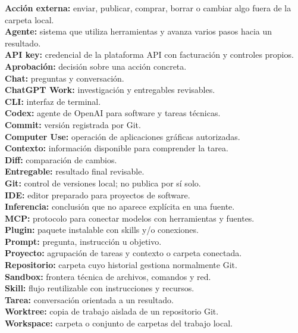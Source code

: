 \documentclass[10pt,a4paper,openany]{book}
\begin{document}
\textbf{Acción externa:} enviar, publicar, comprar, borrar o cambiar
algo fuera de la carpeta local.\\
\textbf{Agente:} sistema que utiliza herramientas y avanza varios pasos
hacia un resultado.\\
\textbf{API key:} credencial de la plataforma API con facturación y
controles propios.\\
\textbf{Aprobación:} decisión sobre una acción concreta.\\
\textbf{Chat:} preguntas y conversación.\\
\textbf{ChatGPT Work:} investigación y entregables revisables.\\
\textbf{CLI:} interfaz de terminal.\\
\textbf{Codex:} agente de OpenAI para software y tareas técnicas.\\
\textbf{Commit:} versión registrada por Git.\\
\textbf{Computer Use:} operación de aplicaciones gráficas autorizadas.\\
\textbf{Contexto:} información disponible para comprender la tarea.\\
\textbf{Diff:} comparación de cambios.\\
\textbf{Entregable:} resultado final revisable.\\
\textbf{Git:} control de versiones local; no publica por sí solo.\\
\textbf{IDE:} editor preparado para proyectos de software.\\
\textbf{Inferencia:} conclusión que no aparece explícita en una
fuente.\\
\textbf{MCP:} protocolo para conectar modelos con herramientas y
fuentes.\\
\textbf{Plugin:} paquete instalable con skills y/o conexiones.\\
\textbf{Prompt:} pregunta, instrucción u objetivo.\\
\textbf{Proyecto:} agrupación de tareas y contexto o carpeta
conectada.\\
\textbf{Repositorio:} carpeta cuyo historial gestiona normalmente Git.\\
\textbf{Sandbox:} frontera técnica de archivos, comandos y red.\\
\textbf{Skill:} flujo reutilizable con instrucciones y recursos.\\
\textbf{Tarea:} conversación orientada a un resultado.\\
\textbf{Worktree:} copia de trabajo aislada de un repositorio Git.\\
\textbf{Workspace:} carpeta o conjunto de carpetas del trabajo local.
\end{document}
